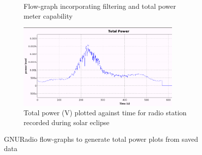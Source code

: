 \begin{figure}
\begin{subfigure}[t]{8cm}
		\caption{Flow-graph incorporating filtering and total power meter capability}
		\label{fig:gnuradio_companion_flowgraph_05}
	\end{subfigure}
	\quad
	\begin{subfigure}[t]{8cm}
		\centering
		\includegraphics[width=8cm]{images/75}
		\caption{Total power (V) plotted against time for radio station recorded during solar eclipse}
		\label{fig:gnuradio_companion_flowgraph_06} 
	\end{subfigure}
	\caption{GNURadio flow-graphs to generate total power plots from saved data}
	\label{fig:gnuradio_companion_flowgraph}
\end{figure}
%
